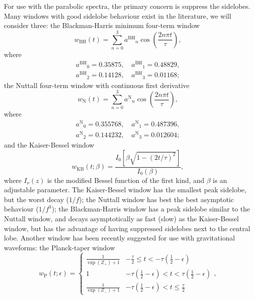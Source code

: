 \documentclass[useAMS,usedcolumn,usegraphicx,usenatbib]{mn2e}
\newcommand{\sub}[1]{\ensuremath{_\mathrm{#1}}}
\newcommand{\super}[1]{\ensuremath{^\mathrm{#1}}}
\newcommand{\recip}[1]{\ensuremath{\frac{1}{#1}}}
\begin{document}
For use with the parabolic spectra, the primary concern is suppress the sidelobes. Many windows with good sidelobe behaviour exist in the literature, we will consider three: the Blackman-Harris minimum four-term window \citep{Harris1978, Nuttall1981}
\begin{equation}
w\sub{BH}(t) = \sum_{n=0}^{3} a\super{BH}_n\cos\left(\frac{2n\pi t}{\tau}\right),
\end{equation}
where
\begin{equation}
\begin{split}
a\super{BH}_0 = 0.35875, \quad a\super{BH}_1 = 0.48829,\\
a\super{BH}_2 = 0.14128, \quad a\super{BH}_3 = 0.01168;
\end{split}
\end{equation}
the Nuttall four-term window with continuous first derivative \citep{Nuttall1981}
\begin{equation}
w\sub{N}(t) = \sum_{n=0}^{3} a\super{N}_n\cos\left(\frac{2n\pi t}{\tau}\right),
\end{equation}
where
\begin{equation}
\begin{split}
a\super{N}_0 = 0.355768, \quad a\super{N}_1 = 0.487396,\\
a\super{N}_2 = 0.144232, \quad a\super{N}_3 = 0.012604;
\end{split}
\end{equation}
and the Kaiser-Bessel window \citep{Harris1978, Kaiser1980}
\begin{equation}
w\sub{KB}(t;\beta) = \frac{I_0\left[\beta\sqrt{1 - (2 t/\tau)^2}\right]}{I_0(\beta)},
\end{equation}
where $I_\nu(z)$ is the modified Bessel function of the first kind, and $\beta$ is an adjustable parameter. The Kaiser-Bessel window has the smallest peak sidelobe, but the worst decay ($1/f$); the Nuttall window has best the best asymptotic behaviour ($1/f^3$); the Blackman-Harris window has a peak sidelobe similar to the Nuttall window, and decays asymptotically as fast (slow) as the Kaiser-Bessel window, but has the advantage of having suppressed sidelobes next to the central lobe. Another window has been recently suggested for use with gravitational waveforms: the Planck-taper window \citep{Damour2000,McKechan2010}
\begin{equation}
w\sub{P}(t; \epsilon) = \begin{cases}
 {\displaystyle \recip{\exp(Z_+)+1}} & {\displaystyle -\frac{\tau}{2} \leq t < -\tau\left(\recip{2} - \epsilon\right)} \\
 1 & {\displaystyle -\tau\left(\recip{2} - \epsilon\right) < t < \tau\left(\recip{2} - \epsilon\right)} \\
 {\displaystyle \recip{\exp(Z_-)+1}} & {\displaystyle -\tau\left(\recip{2} - \epsilon\right) < t \leq \frac{\tau}{2}}
\end{cases},
\end{equation}
\end{document}

